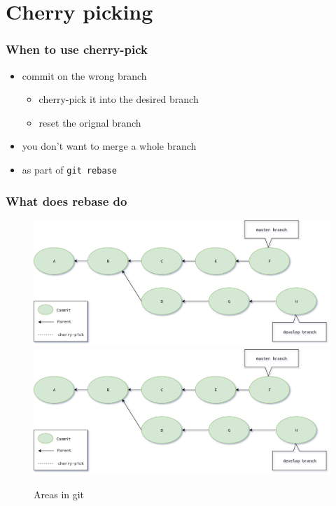 \section{Cherry picking}
\begin{frame}
    \frametitle{When to use cherry-pick}
    \begin{itemize}
        \item commit on the wrong branch
        \begin{itemize}
            \item cherry-pick it into the desired branch
            \item reset the orignal branch
        \end{itemize}
        \item you don't want to merge a whole branch
        \item as part of \texttt{git rebase}
    \end{itemize}
\end{frame}

\begin{frame}[fragile]
    \frametitle{What does rebase do}
    \begin{figure}
        \begin{center}
            {
                \includegraphics[width=1\textwidth,keepaspectratio]{./images/Rebase.png}
            }
            {
                \includegraphics[width=1\textwidth,keepaspectratio]{./images/Rebase.png}
            }
            \caption{Areas in git}
        \end{center}
    \end{figure}
\end{frame}

